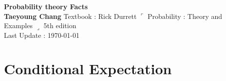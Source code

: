 \documentclass[12pt, A4]{article}
\begin{document}
\begin{titlepage}
	\begin{center}
		\vspace*{5cm}
		\textbf{\Large Probability theory \MakeUppercase{} Facts}
		\\
		\vspace{1.5cm}
		\textbf{Taeyoung Chang}
		\vfill
		Textbook : Rick Durrett $\ulcorner$ Probability : Theory and Examples $\lrcorner$ 5th edition
		\\
		\vspace{0.8cm}
		Last Update : \today
		\vspace*{3cm}
		\thispagestyle{empty}
	\end{center}
\end{titlepage}
\tableofcontents
\clearpage

\section{Conditional Expectation}
\end{document}
